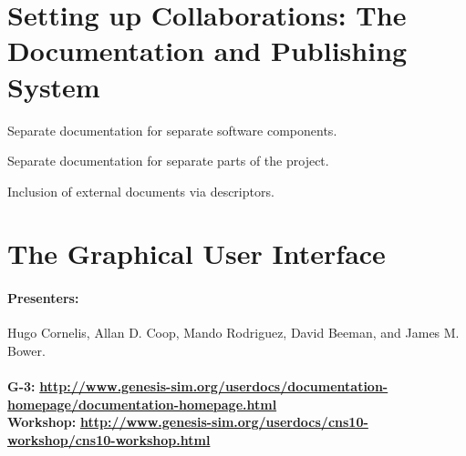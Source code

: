 \documentclass[12pt]{article}
\begin{document}
\section{Setting up Collaborations: The Documentation and Publishing System}

Separate documentation for separate software components.

Separate documentation for separate parts of the project.

Inclusion of external documents via descriptors.



\section{The Graphical User Interface}


\paragraph*{Presenters:}
Hugo Cornelis, Allan D. Coop, Mando Rodriguez, David Beeman, and James M. Bower. \\

 \\
{\bf G-3:} {\scriptsize \href{http://www.genesis-sim.org/userdocs/documentation-homepage/documentation-homepage.html}{\bf http://www.genesis-sim.org/userdocs/documentation-homepage/documentation-homepage.html}} \\
{\bf Workshop:} {\scriptsize \href{http://www.genesis-sim.org/userdocs/cns10-workshop/cns10-workshop.html}{\bf http://www.genesis-sim.org/userdocs/cns10-workshop/cns10-workshop.html}}
\end{document}

